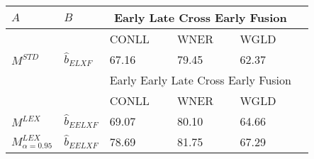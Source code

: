 \begin{tabular}{@{}llllll@{}}
\toprule
    $A$      &    $B$      & \multicolumn{3}{c}{Early Late Cross Early Fusion}                                            \\ \midrule
          &      &      CONLL                     & WNER                      & WGLD                      \\ \cmidrule{3-5}
$M^{STD}$ & $ \hat{b}_{\scriptscriptstyle ELXF}$ & 67.16                      & 79.45                     & 62.37                     \\
\midrule
          &        &   \multicolumn{3}{c}{Early Early Late Cross Early Fusion}                                             \\
\midrule     
          &          & CONLL                      & WNER                      & WGLD                      \\ \cmidrule{3-5}
$M^{LEX}$ & $ \hat{b}_{\scriptscriptstyle EELXF}$ & 69.07                      & 80.10                     & 64.66                     \\
$M^{LEX}_{\alpha=0.95}$ & $ \hat{b}_{\scriptscriptstyle EELXF}$  & 78.69                      & 81.75                     & 67.29                     \\		
\bottomrule
\end{tabular}